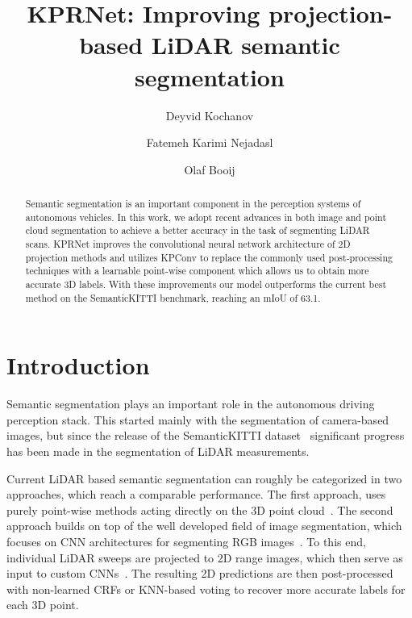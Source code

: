 \documentclass[runningheads]{llncs}
\begin{document}
\pagestyle{headings}
\mainmatter
\def\ECCVSubNumber{100}  

\title{KPRNet: Improving projection-based LiDAR semantic segmentation} 





\author{Deyvid Kochanov \and
Fatemeh Karimi Nejadasl \and
Olaf Booij}


\maketitle

\begin{abstract}

Semantic segmentation is an important component in the perception systems of autonomous vehicles. In this work, we adopt recent advances in both image and point cloud segmentation to achieve a better accuracy in the task of segmenting LiDAR scans. KPRNet improves the convolutional neural network architecture of 2D projection methods and utilizes KPConv to replace the commonly used post-processing techniques with a learnable point-wise component which allows us to obtain more accurate 3D labels. With these improvements our model outperforms the current best method on the SemanticKITTI benchmark, reaching an mIoU of 63.1. 



\end{abstract}

\section{Introduction}
Semantic segmentation plays an important role in the autonomous driving perception stack. This started mainly with the segmentation of camera-based images, but since the release of the SemanticKITTI dataset~\cite{SemanticKITTI} significant progress has been made in the segmentation of LiDAR measurements.

Current LiDAR based semantic segmentation can roughly be categorized in two approaches, which reach a comparable performance. The first approach, uses purely point-wise methods acting directly on the 3D point cloud~\cite{KPConv,randla}. The second approach builds on top of the well developed field of image segmentation, which focuses on CNN architectures for segmenting RGB images~\cite{zhao2017pyramid,chen2017rethinking,yuan2019object,sun2019high}. To this end, individual LiDAR sweeps are projected to 2D range images, which then serve as input to custom CNNs~\cite{rangenet,SalsaNext,squeezesegv3}. The resulting 2D predictions are then post-processed with non-learned CRFs or KNN-based voting to recover more accurate labels for each 3D point.
\end{document}
